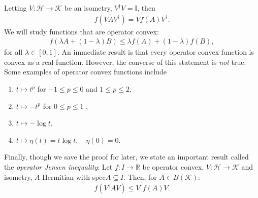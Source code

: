 \documentclass[notoc]{tufte-book}
\begin{document}
Letting $V: \mathcal{H}\rightarrow \mathcal{K}$ be an isometry, $V^{\dagger} V = \mathbb{I}$, then
\begin{align}
    f(VAV^{\dagger})=Vf(A)V^{\dagger}.
\end{align}
We will study functions that are operator convex:
    \begin{align}
        f(\lambda A + (1-\lambda)B) \leq \lambda f(A)+(1-\lambda)f(B), 
    \end{align}
for all $\lambda \in [0,1].$ An immediate result is that every operator convex function is convex as a real function. However, the converse of this statement is \textit{not} true. Some examples of operator convex functions include
\begin{enumerate}
    \item $t\mapsto t^p$ for $-1 \leq p \leq 0$ and $1\leq p \leq 2$,
    \item $t\mapsto -t^p$ for $0 \leq p \leq 1$ ,
    \item $t \mapsto -\log{t}$,
    \item $t \mapsto \eta(t)=t\log{t}, \quad \eta(0)=0$.
\end{enumerate}
Finally, though we save the proof for later, we state an important result called the \textit{operator Jensen inequality}: Let $f: I \rightarrow \mathbb{R}$ be operator convex, $V: \mathcal{H}\rightarrow \mathcal{K}$ and isometry, $A$ Hermitian with spec$A\subseteq I$. Then, for $A \in B(\mathcal{K})$: 
\begin{align}\label{eq:operator-Jensens}
    f(V^{\dagger}A V) \leq V^{\dagger} f(A) V.
\end{align}
\end{document}
